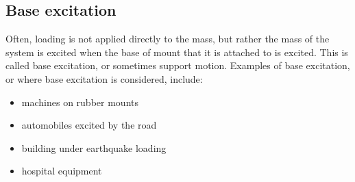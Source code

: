 \documentclass[12pt,letter]{article}
\numberwithin{ex}{section} %
\numberwithin{re}{section} %
\begin{document}
	
		\subsection{Base excitation}

Often, loading is not applied directly to the mass, but rather the mass of the system is excited when the base of mount that it is attached to is excited. This is called base excitation, or sometimes support motion. Examples of base excitation, or where base excitation is considered, include:

\begin{itemize}
\item machines on rubber mounts
\item automobiles excited by the road
\item building under earthquake loading
\item hospital equipment
\end{itemize}
\end{document}
